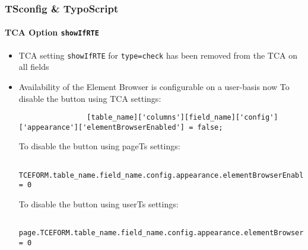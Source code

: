 \begin{frame}[fragile]
	\frametitle{TSconfig \& TypoScript}
	\framesubtitle{TCA Option \texttt{showIfRTE}}

	\lstset{basicstyle=\tiny\ttfamily}

	\begin{itemize}
		\item TCA setting \texttt{showIfRTE} for \texttt{type=check} has been removed from the TCA on all fields
		\item Availability of the Element Browser is configurable on a user-basis now\newline
			\smaller
				To disable the button using TCA settings:
			\normalsize

			\begin{lstlisting}
				[table_name]['columns'][field_name]['config']['appearance']['elementBrowserEnabled'] = false;
			\end{lstlisting}

			\smaller
				To disable the button using pageTs settings:
			\normalsize

			\begin{lstlisting}
				TCEFORM.table_name.field_name.config.appearance.elementBrowserEnabled = 0
			\end{lstlisting}

			\smaller
				To disable the button using userTs settings:
			\normalsize

			\begin{lstlisting}
				page.TCEFORM.table_name.field_name.config.appearance.elementBrowserEnabled = 0
			\end{lstlisting}

	\end{itemize}

\end{frame}


